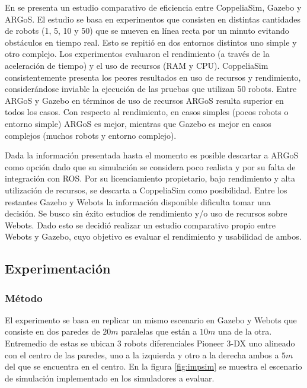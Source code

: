 En \cite{Pitonakova2018} se presenta un estudio comparativo de eficiencia entre
CoppeliaSim, Gazebo y ARGoS. El estudio se basa en experimentos que consisten
en distintas cantidades de robots (1, 5, 10 y 50) que se mueven en línea recta por un minuto
evitando obstáculos en tiempo real. Esto se repitió en dos entornos distintos
uno simple y otro complejo. Los experimentos evaluaron el rendimiento (a través
de la aceleración de tiempo) y el uso de recursos (RAM y CPU). CoppeliaSim
consistentemente presenta los peores resultados en uso de recursos y
rendimiento, considerándose inviable la ejecución de las pruebas que utilizan
50 robots. Entre ARGoS y Gazebo en términos de uso de recursos ARGoS resulta
superior en todos los casos. Con respecto al rendimiento, en casos simples
(pocos robots o entorno simple) ARGoS es mejor, mientras que Gazebo es mejor en
casos complejos (muchos robots y entorno complejo).

Dada la información presentada hasta el momento es posible descartar a ARGoS como
opción dado que su simulación se considera poco realista y por su falta de
integración con \gls{ROS}. Por su licenciamiento propietario, bajo rendimiento y alta
utilización de recursos, se descarta a CoppeliaSim como posibilidad. Entre los
restantes Gazebo y Webots la información disponible dificulta tomar una
decisión. Se busco sin éxito estudios de rendimiento y/o uso de recursos sobre
Webots. Dado esto se decidió realizar un estudio comparativo propio
entre Webots y Gazebo, cuyo objetivo es evaluar el rendimiento y usabilidad de
ambos.

\subsection{Experimentación}

\subsubsection{Método}
El experimento se basa en replicar un mismo escenario en Gazebo y Webots que 
consiste en dos paredes de $20m$ paralelas que están a $10m$ una de la otra.
Entremedio de estas se ubican 3 robots diferenciales Pioneer 3-DX \cite{p3dx} uno alineado
con el centro de las paredes, uno a la izquierda y otro a la derecha ambos a
$5m$ del que se encuentra en el centro. En la figura \ref{fig:impsim} se
muestra el escenario de simulación implementado en los simuladores a evaluar.

